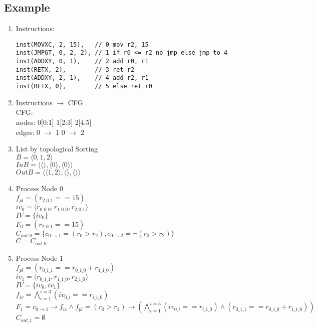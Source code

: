 \documentclass{article}
\begin{document}
\subsection{Example}
\begin{enumerate}
\item Instructions:
\begin{lstlisting}
inst(MOVXC, 2, 15),   // 0 mov r2, 15
inst(JMPGT, 0, 2, 2), // 1 if r0 <= r2 no jmp else jmp to 4
inst(ADDXY, 0, 1),    // 2 add r0, r1
inst(RETX, 2),        // 3 ret r2
inst(ADDXY, 2, 1),    // 4 add r2, r1
inst(RETX, 0),        // 5 else ret r0
\end{lstlisting}
\item Instructions $\rightarrow$ CFG \\
CFG:\\
nodes: 0[0:1] 1[2:3] 2[4:5] \\
edges: 0 $\rightarrow$ 1 0 $\rightarrow$ 2 
\item List by topological Sorting \\
$B = \langle 0, 1, 2 \rangle$ \\
$InB = \langle \langle\rangle, \langle 0 \rangle, \langle 0 \rangle \rangle$ \\
$OutB = \langle \langle 1, 2 \rangle, \langle\rangle, \langle  \rangle \rangle$
\item Process Node 0 \\
$f_{pl} = (r_{2\_0\_1} == 15)$\\
$iv_0 = \langle r_{0\_0\_0},r_{1\_0\_0},r_{2\_0\_1}\rangle$ \\
$IV = \{iv_0\}$\\
$F_0 = (r_{2\_0\_1} == 15)$ \\
$C_{out\_0} = \{ c_{0\rightarrow 1}=(r_0 > r_2), c_{0\rightarrow 2}=\neg(r_0 > r_2)\}$ \\
$C = C_{out\_0}$
\item Process Node 1 \\
$f_{pl} = (r_{0\_1\_1} == r_{0\_1\_0} + r_{1\_1\_0})$\\
$iv_1 = \langle r_{0\_1\_1},r_{1\_1\_0},r_{2\_1\_0}\rangle$\\ 
$IV = \{iv_0, iv_1\}$\\
$f_{iv} = \bigwedge_{i=1}^{i=3} (iv_{0\_i} == r_{i\_1\_0})$\\
$F_1 = c_{0\rightarrow 1} \rightarrow f_{iv} \wedge f_{pl} = (r_0 > r_2)\rightarrow (\bigwedge_{i=1}^{i=3} (iv_{0\_i} == r_{i\_1\_0}) \wedge (r_{0\_1\_1} == r_{0\_1\_0} + r_{1\_1\_0}))$ \\
$C_{out\_1} = \emptyset$ \\

\end{enumerate}
\end{document}
